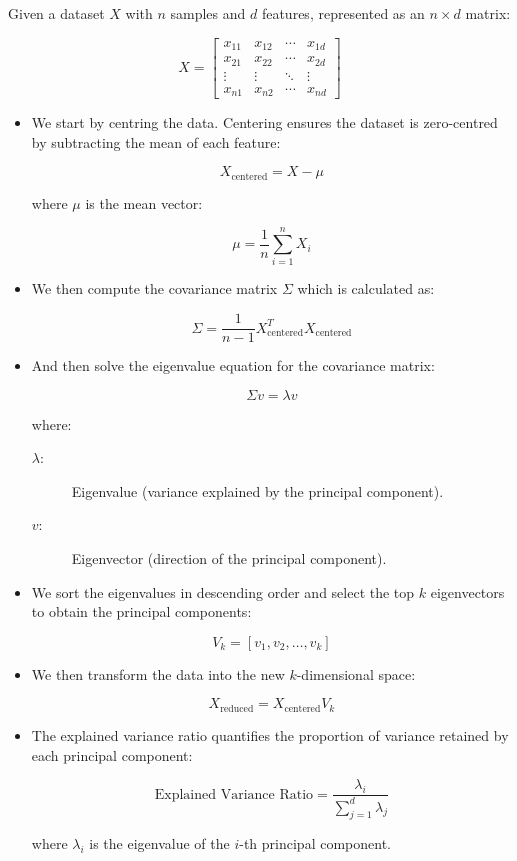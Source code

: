 		Given a dataset  $X$ with  $n$ samples and  $d$ features, represented as an  $n \times d$ matrix:
		
		$$
		X = 
		\begin{bmatrix}
			x_{11} & x_{12} & \cdots & x_{1d} \\
			x_{21} & x_{22} & \cdots & x_{2d} \\
			\vdots & \vdots & \ddots & \vdots \\
			x_{n1} & x_{n2} & \cdots & x_{nd}
		\end{bmatrix}
		$$
		
		
		\begin{itemize}
			\item We start by centring the data. Centering ensures the dataset is zero-centred by subtracting the mean of each feature:
			
			$$
			X_{\text{centered}} = X - \mu
			$$
			
			where  $\mu$ is the mean vector:
			
			$$
			\mu = \frac{1}{n} \sum_{i=1}^n X_i
			$$
			
			\item We then compute the covariance matrix $\Sigma$ which is calculated as:
			
			$$
			\Sigma = \frac{1}{n-1} X_{\text{centered}}^T X_{\text{centered}}
			$$
			
			\item And then solve the eigenvalue equation for the covariance matrix:
			
			$$
			\Sigma v = \lambda v
			$$
			
			where:
			\begin{description}
				\item[$\lambda$:] Eigenvalue (variance explained by the principal component).
				\item[$v$:] Eigenvector (direction of the principal component).
			\end{description}
			
			
			\item We sort the eigenvalues in descending order and select the top  $k$ eigenvectors to obtain the principal components:
			
			$$
			V_k = [v_1, v_2, \dots, v_k]
			$$
			
			
			\item We then transform the data into the new  $k$-dimensional space:
			
			$$
			X_{\text{reduced}} = X_{\text{centered}} V_k
			$$
			
			\item The explained variance ratio quantifies the proportion of variance retained by each principal component:
			
			$$
			\text{Explained Variance Ratio} = \frac{\lambda_i}{\sum_{j=1}^d \lambda_j}
			$$
			
			where  $\lambda_i$ is the eigenvalue of the  $i$-th principal component.
		\end{itemize}
	
